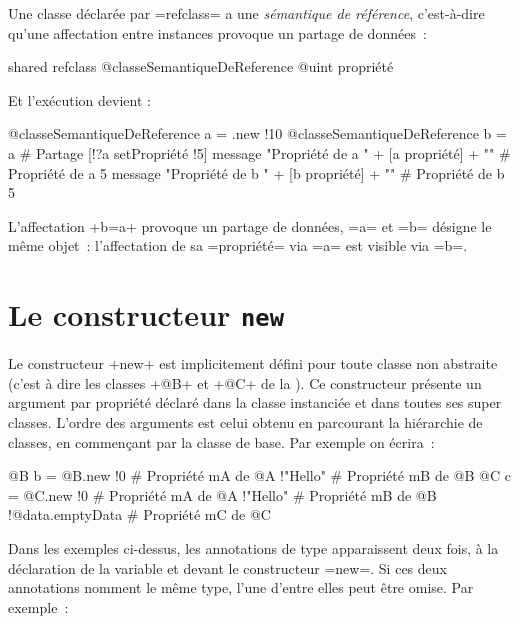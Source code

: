 
Une classe déclarée par \ggst=refclass= a une \emph{sémantique de référence}, c'est-à-dire qu'une affectation entre instances provoque un partage de données~:

\begin{galgas3}
shared refclass @classeSemantiqueDeReference {
  @uint propriété
}
\end{galgas3}

Et l'exécution devient :

\begin{galgas3}
@classeSemantiqueDeReference a = .new {!10}
@classeSemantiqueDeReference b = a # Partage
[!?a setPropriété !5]
message "Propriété de a " + [a propriété] + "\n" # Propriété de a 5
message "Propriété de b " + [b propriété] + "\n" # Propriété de b 5
\end{galgas3}

L'affectation \ggst+b=a+ provoque un partage de données, \ggst=a= et \ggst=b= désigne le même objet~: l'affectation de sa \ggst=propriété= via \ggst=a= est visible via \ggst=b=.








\section{Le constructeur \texttt{new}}

Le constructeur \ggst+new+ est implicitement défini pour toute classe non abstraite (c'est à dire les classes \ggst+@B+ et \ggst+@C+ de la ). Ce constructeur présente un argument par propriété déclaré dans la classe instanciée et dans toutes ses super classes. L'ordre des arguments est celui obtenu en parcourant la hiérarchie de classes, en commençant par la classe de base. Par exemple on écrira~:

\begin{galgas3}
@B b = @B.new {
  !0 # Propriété mA de @A
  !"Hello" # Propriété mB de @B
}
@C c = @C.new {
  !0 # Propriété mA de @A
  !"Hello" # Propriété mB de @B
  !@data.emptyData # Propriété mC de @C
}
\end{galgas3}

Dans les exemples ci-dessus, les annotations de type apparaissent deux fois, à la déclaration de la variable et devant le constructeur \ggst=new=. Si ces deux annotations nomment le même type, l'une d'entre elles peut être omise. Par exemple~:

